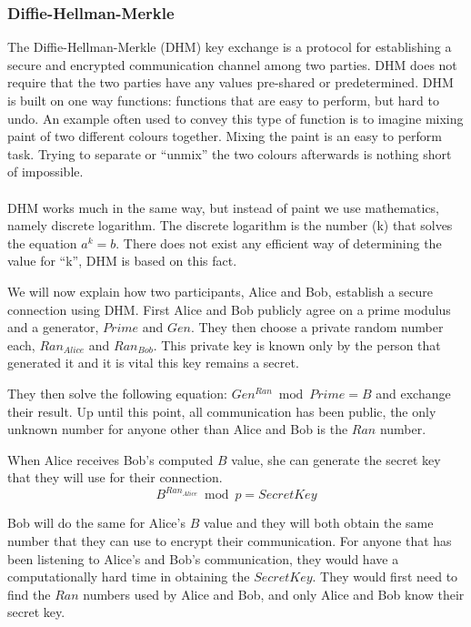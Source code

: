 \subsubsection{Diffie-Hellman-Merkle}
\label{sec:dhm}
The Diffie-Hellman-Merkle (DHM) key exchange \cite{diffie1976new} is a protocol for establishing a secure and encrypted communication channel among two parties. DHM does not require that the two parties have any values pre-shared or predetermined. DHM is built on one way functions: functions that are easy to perform, but hard to undo. An example often used to convey this type of function is to imagine mixing paint of two different colours together. Mixing the paint is an easy to perform task. Trying to separate or ``unmix'' the two colours afterwards is nothing short of impossible.
\\\\
DHM works much in the same way, but instead of paint we use mathematics, namely discrete logarithm. The discrete logarithm is the number (k) that solves the equation $ a^k = b $. There does not exist any efficient way of determining the value for ``k'', DHM is based on this fact. 

We will now explain how two participants, Alice and Bob, establish a secure connection using DHM. First Alice and Bob publicly agree on a prime modulus and a generator, $Prime$ and $Gen$. They then choose a private random number each, ${Ran_{Alice}}$ and ${Ran_{Bob}}$. This private key is known only by the person that generated it and it is vital this key remains a secret.

They then solve the following equation: $Gen^{Ran} \bmod Prime = B$ and exchange their result. Up until this point, all communication has been public, the only unknown number for anyone other than Alice and Bob is the $Ran$ number.

When Alice receives Bob's computed $B$ value, she can generate the secret key that they will use for their connection.
$$
  B^{Ran_{Alice}} \bmod p = SecretKey
$$

Bob will do the same for Alice's $B$ value and they will both obtain the same number that they can use to encrypt their communication. For anyone that has been listening to Alice's and Bob's communication,  they would have a computationally hard time in obtaining the $SecretKey$. They would first need to find the $Ran$ numbers used by Alice and Bob, and only Alice and Bob know their secret key.
